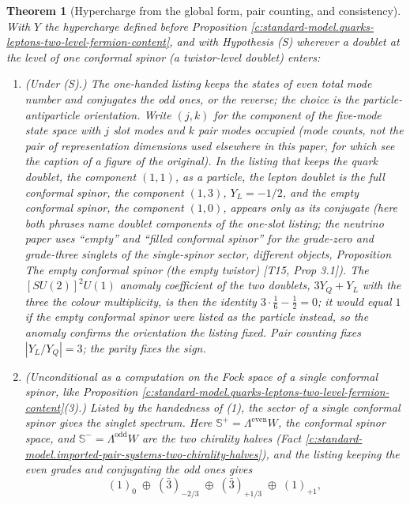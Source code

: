 \documentclass[11pt]{article}
\newtheorem{theorem}{Theorem}[section]
\theoremstyle{definition}
\theoremstyle{plain}
\newcommand{\changedmark}[2]{\marginpar{\raggedright\scriptsize\color{#1}#2}}
\providecommand{\CS}{}\renewcommand{\CS}{{\mathbb{S}^{+}}}
\providecommand{\CSm}{}\renewcommand{\CSm}{{\mathbb{S}^{-}}}
\begin{document}
\begin{theorem}[Hypercharge from the global form, pair counting, and consistency]\label{c:standard-model.hypercharge-global-form-pair-counting-consistency}
\changedmark{gray}{reworded}
With $Y$ the hypercharge defined before Proposition \ref{c:standard-model.quarks-leptons-two-level-fermion-content}, and with Hypothesis (S) wherever a doublet at the level of one conformal spinor (a twistor-level doublet) enters:
\begin{enumerate}
\item (Under (S).) The one-handed listing keeps the states of even total mode number and conjugates the odd ones, or the reverse; the choice is the particle-antiparticle orientation. Write $(j, k)$ for the component of the five-mode state space with $j$ slot modes and $k$ pair modes occupied (mode counts, not the pair of representation dimensions used elsewhere in this paper, for which see the caption of a figure of the original). In the listing that keeps the quark doublet, the component $(1,1)$, as a particle, the lepton doublet is the full conformal spinor, the component $(1,3)$, $Y_{L} = -1/2$, and the empty conformal spinor, the component $(1,0)$, appears only as its conjugate (here both phrases name doublet components of the one-slot listing; the neutrino paper uses ``empty'' and ``filled conformal spinor'' for the grade-zero and grade-three singlets of the single-spinor sector, different objects, Proposition \emph{The empty conformal spinor (the empty twistor)} [T15, Prop 3.1]). The $[SU(2)]^{2}U(1)$ anomaly coefficient of the two doublets, $3Y_{Q} + Y_{L}$ with the three the colour multiplicity, is then the identity $3 \cdot \tfrac16 - \tfrac12 = 0$; it would equal $1$ if the empty conformal spinor were listed as the particle instead, so the anomaly confirms the orientation the listing fixed. Pair counting fixes $|Y_{L}/Y_{Q}| = 3$; the parity fixes the sign.
\item (Unconditional as a computation on the Fock space of a single conformal spinor, like Proposition \ref{c:standard-model.quarks-leptons-two-level-fermion-content}(3).) Listed by the handedness of (1), the sector of a single conformal spinor gives the singlet spectrum. Here $\CS = \Lambda^{\mathrm{even}}W$, the conformal spinor space, and $\CSm{} = \Lambda^{\mathrm{odd}}W$ are the two chirality halves (Fact \ref{c:standard-model.imported-pair-systems-two-chirality-halves}), and the listing keeping the even grades and conjugating the odd ones gives
\[
(1)_{0} \;\oplus\; (\bar{3})_{-2/3} \;\oplus\; (\bar{3})_{+1/3} \;\oplus\; (1)_{+1},
\]
\end{enumerate}
\end{theorem}
\end{document}
